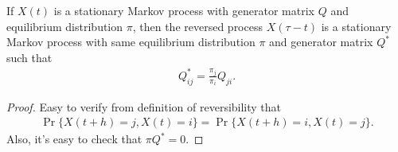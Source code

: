 \documentclass[a4paper,10pt,english]{article}
\begin{document}
\begin{lem} If $X(t)$ is a stationary Markov process with generator matrix $Q$ and equilibrium distribution $\pi$, then the reversed process $X(\tau -t)$ is a stationary Markov process with same equilibrium distribution $\pi$ and generator matrix $Q^{\ast}$ such that
\begin{align*}
Q^{\ast}_{ij} = \frac{\pi_j}{\pi_i}Q_{ji}.
\end{align*}
\end{lem}
\begin{proof} Easy to verify from definition of reversibility that 
\begin{align*}
\Pr\{X(t+h) = j, X(t) = i\} = \Pr\{X(t+h) = i, X(t) = j\}.
\end{align*}
Also, it's easy to check that $\pi Q^{\ast} = 0$.
\end{proof}
\end{document}
